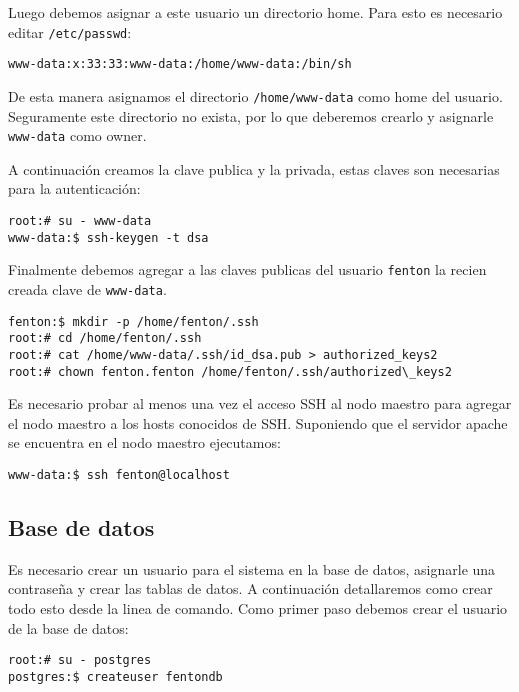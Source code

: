 \documentclass[a4paper,10pt,spanish]{article}
\begin{document}
Luego debemos asignar a este usuario un directorio home. Para esto es necesario editar \mbox{\texttt{/etc/passwd}}:

\begin{verbatim}
www-data:x:33:33:www-data:/home/www-data:/bin/sh
\end{verbatim}

De esta manera asignamos el directorio \mbox{\texttt{/home/www-data}} como home del usuario. Seguramente este directorio no exista, por lo que deberemos crearlo y asignarle \mbox{\texttt{www-data}} como owner.

A continuaci\'{o}n creamos la clave publica y la privada, estas claves son necesarias para la autenticaci\'{o}n:

\begin{verbatim}
root:# su - www-data
www-data:$ ssh-keygen -t dsa
\end{verbatim}

Finalmente debemos agregar a las claves publicas del usuario \mbox{\texttt{fenton}} la recien creada clave de \mbox{\texttt{www-data}}.

\begin{verbatim}
fenton:$ mkdir -p /home/fenton/.ssh
root:# cd /home/fenton/.ssh
root:# cat /home/www-data/.ssh/id_dsa.pub > authorized_keys2
root:# chown fenton.fenton /home/fenton/.ssh/authorized\_keys2
\end{verbatim}

Es necesario probar al menos una vez el acceso SSH al nodo maestro para agregar el nodo maestro a los hosts conocidos de SSH. Suponiendo que el servidor apache se encuentra en el nodo maestro ejecutamos:

\begin{verbatim}
www-data:$ ssh fenton@localhost
\end{verbatim}

\subsection{Base de datos}

Es necesario crear un usuario para el sistema en la base de datos, asignarle una contrase\~{n}a y crear las tablas de datos. A continuaci\'{o}n detallaremos como crear todo esto desde la linea de comando. Como primer paso debemos crear el usuario de la base de datos:

\begin{verbatim}
root:# su - postgres 
postgres:$ createuser fentondb 
\end{verbatim}
\end{document}
